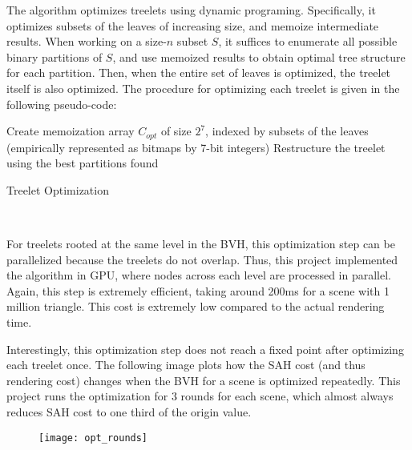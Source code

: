 The algorithm optimizes treelets using dynamic programing. Specifically, it optimizes subsets of the leaves of increasing size, and memoize intermediate results. When working on a size-$n$ subset $S$, it suffices to enumerate all possible binary partitions of $S$, and use memoized results to obtain optimal tree structure for each partition. Then, when the entire set of leaves is optimized, the treelet itself is also optimized. The procedure for optimizing each treelet is given in the following pseudo-code:

\begin{algorithm}[H]
    \label{algo optimize treelet}
    Create memoization array $C_{opt}$ of size $2^7$, indexed by subsets of the leaves (empirically represented as bitmaps by 7-bit integers)\;
    Restructure the treelet using the best partitions found\;
    \caption{Treelet Optimization}
\end{algorithm} 

~

For treelets rooted at the same level in the BVH, this optimization step can be parallelized because the treelets do not overlap. Thus, this project implemented the algorithm in GPU, where nodes across each level are processed in parallel. Again, this step is extremely efficient, taking around 200ms for a scene with 1 million triangle. This cost is extremely low compared to the actual rendering time.

\thispagestyle{empty}
\enlargethispage{5\baselineskip}

Interestingly, this optimization step does not reach a fixed point after optimizing each treelet once. The following image plots how the SAH cost (and thus rendering cost) changes when the BVH for a scene is optimized repeatedly. This project runs the optimization for 3 rounds for each scene, which almost always reduces SAH cost to one third of the origin value.

\begin{figure}[H]
    \centering
    \texttt{[image: opt\_rounds]}
\end{figure}

